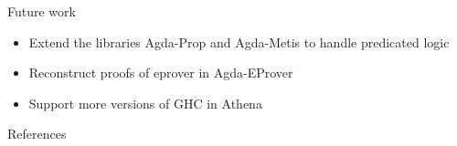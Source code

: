 \documentclass[xetex, mathserif, serif,hyperref={pdfpagelabels=false}]{beamer}
\begin{document}
\begin{frame}{Future work}

  \begin{itemize}
  \item
    Extend the libraries Agda-Prop and Agda-Metis to handle predicated logic
  \item
    Reconstruct proofs of eprover in Agda-EProver
  \item
    Support more versions of GHC in Athena
  \end{itemize}

\end{frame}


\begin{frame}{References}

\end{frame}
\end{document}
